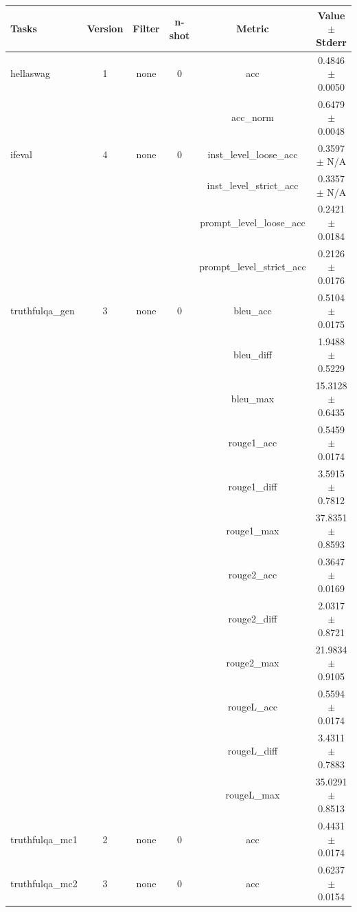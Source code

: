\documentclass{ifacconf}
\begin{document}
	\begin{strip}
		\begin{minipage}{\textwidth}
			\begin{table}[H]
				\centering
				\begin{tabular}{|l|c|c|c|c|c|}
					\hline
					\textbf{Tasks} & \textbf{Version} & \textbf{Filter} & \textbf{n-shot} & \textbf{Metric} & \textbf{Value} $\pm$ \textbf{Stderr} \\ \hline
					hellaswag & 1 & none & 0 & acc & 0.4846 $\pm$ 0.0050 \\ \hline
					& & & & acc\_norm & 0.6479 $\pm$ 0.0048 \\ \hline
					ifeval & 4 & none & 0 & inst\_level\_loose\_acc & 0.3597 $\pm$ N/A \\ \hline
					& & & & inst\_level\_strict\_acc & 0.3357 $\pm$ N/A \\ \hline
					& & & & prompt\_level\_loose\_acc & 0.2421 $\pm$ 0.0184 \\ \hline
					& & & & prompt\_level\_strict\_acc & 0.2126 $\pm$ 0.0176 \\ \hline
					truthfulqa\_gen & 3 & none & 0 & bleu\_acc & 0.5104 $\pm$ 0.0175 \\ \hline
					& & & & bleu\_diff & 1.9488 $\pm$ 0.5229 \\ \hline
					& & & & bleu\_max & 15.3128 $\pm$ 0.6435 \\ \hline
					& & & & rouge1\_acc & 0.5459 $\pm$ 0.0174 \\ \hline
					& & & & rouge1\_diff & 3.5915 $\pm$ 0.7812 \\ \hline
					& & & & rouge1\_max & 37.8351 $\pm$ 0.8593 \\ \hline
					& & & & rouge2\_acc & 0.3647 $\pm$ 0.0169 \\ \hline
					& & & & rouge2\_diff & 2.0317 $\pm$ 0.8721 \\ \hline
					& & & & rouge2\_max & 21.9834 $\pm$ 0.9105 \\ \hline
					& & & & rougeL\_acc & 0.5594 $\pm$ 0.0174 \\ \hline
					& & & & rougeL\_diff & 3.4311 $\pm$ 0.7883 \\ \hline
					& & & & rougeL\_max & 35.0291 $\pm$ 0.8513 \\ \hline
					truthfulqa\_mc1 & 2 & none & 0 & acc & 0.4431 $\pm$ 0.0174 \\ \hline
					truthfulqa\_mc2 & 3 & none & 0 & acc & 0.6237 $\pm$ 0.0154 \\ \hline
				\end{tabular}
				\label{tab:gemma2_q4km}
			\end{table}
			

\end{minipage}
\end{strip}
\end{document}
